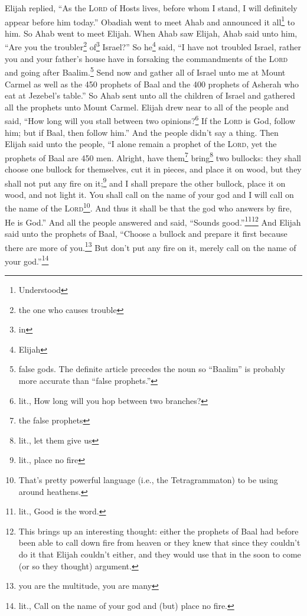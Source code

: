 \begin{inparaenum}
     Elijah replied, ``As the \textsc{Lord} of Hosts lives, before whom I stand, I will definitely appear before him today.''%
     Obadiah went to meet Ahab and announced it all\footnote{Understood} to him. So Ahab went to meet Elijah.%
     When Ahab saw Elijah, Ahab said unto him, ``Are you the troubler\footnote{the one who causes trouble} of\footnote{in} Israel?''%
     So he\footnote{Elijah} said, ``I have not troubled Israel, rather you and your father's house have in forsaking the commandments of the \textsc{Lord} and going after Baalim.\footnote{false gods. The definite article precedes the noun so ``Baalim'' is probably more accurate than ``false prophets.''}%
     Send now and gather all of Israel unto me at Mount Carmel as well as the 450 prophets of Baal and the 400 prophets of Asherah who eat at Jezebel's table.''%
     So Ahab sent unto all the children of Israel and gathered all the prophets unto Mount Carmel.%
     Elijah drew near to all of the people and said, ``How long will you stall between two opinions?\footnote{lit., How long will you hop between two branches?} If the \textsc{Lord} is God, follow him; but if Baal, then follow him.'' And the people didn't say a thing.%
     Then Elijah said unto the people, ``I alone remain a prophet of the \textsc{Lord}, yet the prophets of Baal are 450 men.%
     Alright, have them\footnote{the false prophets} bring\footnote{lit., let them give us} two bullocks: they shall choose one bullock for themselves, cut it in pieces, and place it on wood, but they shall not put any fire on it;\footnote{lit., place no fire} and I shall prepare the other bullock, place it on wood, and not light it.%
     You shall call on the name of your god and I will call on the name of the \textsc{Lord}\footnote{That's pretty powerful language (i.e., the Tetragrammaton) to be using around heathens.}. And thus it shall be that the god who answers by fire, He is God.'' And all the people answered and said, ``Sounds good.''\footnote{lit., Good is the word.}\footnote{This brings up an interesting thought: either the prophets of Baal had before been able to call down fire from heaven or they knew that since they couldn't do it that Elijah couldn't either, and they would use that in the soon to come (or so they thought) argument.}%
     And Elijah said unto the prophets of Baal, ``Choose a bullock and prepare it first because there are more of you.\footnote{you are the multitude, you are many} But don't put any fire on it, merely call on the name of your god.''\footnote{lit., Call on the name of your god and (but) place no fire.}%

\end{inparaenum}
